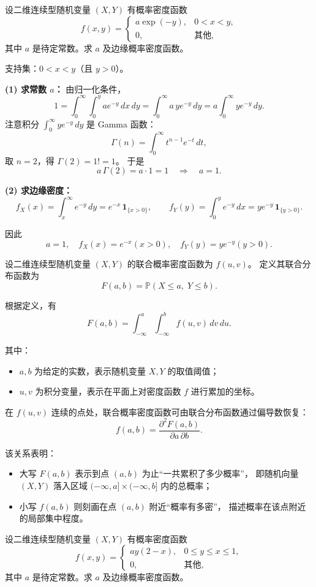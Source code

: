 \begin{homework}[29]
设二维连续型随机变量 $(X,Y)$ 有概率密度函数
\[
f(x,y) =
\begin{cases}
a \exp(-y), & 0 < x < y, \\[6pt]
0, & \text{其他},
\end{cases}
\]
其中 $a$ 是待定常数。求 $a$ 及边缘概率密度函数。
\end{homework}

\begin{solution}
支持集：$0<x<y$（且 $y>0$）。

\textbf{(1) 求常数 $a$：}
由归一化条件，
\[
1=\int_{0}^{\infty}\!\!\int_{0}^{y} a e^{-y}\,dx\,dy
   =\int_{0}^{\infty} a\,y e^{-y}\,dy
   =a \int_{0}^{\infty} y e^{-y}\,dy.
\]
注意积分 $\displaystyle\int_{0}^{\infty} y e^{-y}\,dy$ 是 Gamma 函数：
\[
\Gamma(n)=\int_0^{\infty} t^{n-1} e^{-t}\,dt,
\]
取 $n=2$，得 $\Gamma(2)=1! = 1$。
于是
\[
a\,\Gamma(2)=a\cdot 1=1\quad\Rightarrow\quad a=1.
\]

\textbf{(2) 求边缘密度：}
\[
f_X(x)=\int_{x}^{\infty} e^{-y}\,dy
= e^{-x}\,\mathbf 1_{\{x>0\}},\qquad
f_Y(y)=\int_{0}^{y} e^{-y}\,dx
= y e^{-y}\,\mathbf 1_{\{y>0\}}.
\]

因此
\[
\boxed{a=1,\quad f_X(x)=e^{-x}(x>0),\quad f_Y(y)=y e^{-y}(y>0).}
\]
\end{solution}
\begin{dxtips}
    设二维连续型随机变量 $(X,Y)$ 的联合概率密度函数为 $f(u,v)$。
定义其联合分布函数为
\[
F(a,b)
=
\mathbb P(X\le a,\; Y\le b).
\]

根据定义，有
\[
F(a,b)
=
\int_{-\infty}^{a}\int_{-\infty}^{b}
f(u,v)\,dv\,du.
\]

其中：
\begin{itemize}
  \item $a,b$ 为给定的实数，表示随机变量 $X,Y$ 的取值阈值；
  \item $u,v$ 为积分变量，表示在平面上对密度函数 $f$ 进行累加的坐标。
\end{itemize}

在 $f(u,v)$ 连续的点处，联合概率密度函数可由联合分布函数通过偏导数恢复：
\[
f(a,b)
=
\frac{\partial^2 F(a,b)}{\partial a\,\partial b}.
\]

该关系表明：
\begin{itemize}
  \item 大写 $F(a,b)$ 表示到点 $(a,b)$ 为止“一共累积了多少概率”，
  即随机向量 $(X,Y)$ 落入区域
  $(-\infty,a]\times(-\infty,b]$ 内的总概率；
  \item 小写 $f(a,b)$ 则刻画在点 $(a,b)$ 附近“概率有多密”，
  描述概率在该点附近的局部集中程度。
\end{itemize}
\end{dxtips}
\begin{homework}[30]
设二维连续型随机变量 $(X,Y)$ 有概率密度函数
\[
f(x,y) =
\begin{cases}
a y (2 - x), & 0 \leq y \leq x \leq 1, \\[6pt]
0, & \text{其他},
\end{cases}
\]
其中 $a$ 是待定常数。求 $a$ 及边缘概率密度函数。
\end{homework}

